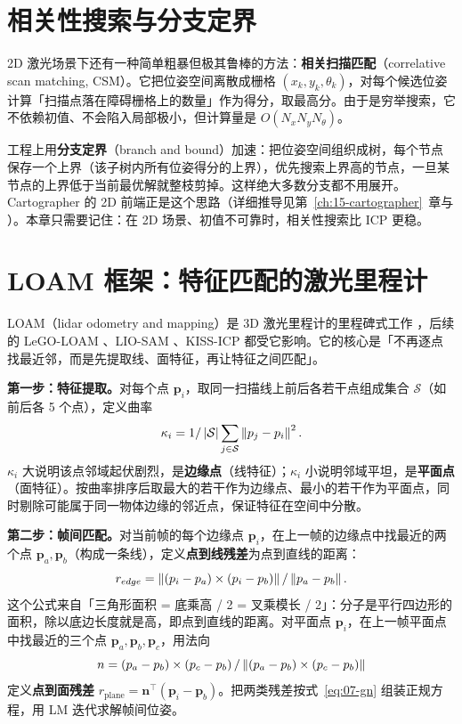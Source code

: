 \section{相关性搜索与分支定界}\label{sec:07-csm}

2D 激光场景下还有一种简单粗暴但极其鲁棒的方法：\textbf{相关扫描匹配}（correlative scan matching, CSM）。它把位姿空间离散成栅格 $(x_k,y_k,\theta_k)$，对每个候选位姿计算「扫描点落在障碍栅格上的数量」作为得分，取最高分。由于是穷举搜索，它不依赖初值、不会陷入局部极小，但计算量是 $O(N_xN_yN_\theta)$。

工程上用\textbf{分支定界}（branch and bound）加速：把位姿空间组织成树，每个节点保存一个上界（该子树内所有位姿得分的上界），优先搜索上界高的节点，一旦某节点的上界低于当前最优解就整枝剪掉。这样绝大多数分支都不用展开。Cartographer 的 2D 前端正是这个思路（详细推导见第~\ref{ch:15-cartographer}~章与 \cite{hess2016cartographer}）。本章只需要记住：在 2D 场景、初值不可靠时，相关性搜索比 ICP 更稳。

\section{LOAM 框架：特征匹配的激光里程计}\label{sec:07-loam}

LOAM（lidar odometry and mapping）是 3D 激光里程计的里程碑式工作 \cite{zhang2014loam}，后续的 LeGO-LOAM \cite{shan2018lego}、LIO-SAM \cite{shan2020liosam}、KISS-ICP \cite{vizzo2023kissicp} 都受它影响。它的核心是「不再逐点找最近邻，而是先提取线、面特征，再让特征之间匹配」。

\textbf{第一步：特征提取。}对每个点 $\bm{p}_i$，取同一扫描线上前后各若干点组成集合 $\mathcal{S}$（如前后各 5 个点），定义曲率
\begin{equation}
  \kappa_i = 1/\left\lvert \mathcal{S} \right\rvert\sum_{j\in\mathcal{S}}\left\lVert p_j-p_i \right\rVert^{2}.
  \label{eq:07-curvature}
\end{equation}
$\kappa_i$ 大说明该点邻域起伏剧烈，是\textbf{边缘点}（线特征）；$\kappa_i$ 小说明邻域平坦，是\textbf{平面点}（面特征）。按曲率排序后取最大的若干作为边缘点、最小的若干作为平面点，同时剔除可能属于同一物体边缘的邻近点，保证特征在空间中分散。

\textbf{第二步：帧间匹配。}对当前帧的每个边缘点 $\bm{p}_i$，在上一帧的边缘点中找最近的两个点 $\bm{p}_a,\bm{p}_b$（构成一条线），定义\textbf{点到线残差}为点到直线的距离：
\begin{equation}
  r_{edge} = \left\lVert \left(p_i-p_a\right)\times\left(p_i-p_b\right) \right\rVert/\left\lVert p_a-p_b \right\rVert.
\end{equation}
这个公式来自「三角形面积 = 底乘高 / 2 = 叉乘模长 / 2」：分子是平行四边形的面积，除以底边长度就是高，即点到直线的距离。对平面点 $\bm{p}_i$，在上一帧平面点中找最近的三个点 $\bm{p}_a,\bm{p}_b,\bm{p}_c$，用法向
\begin{equation}
  n = \left(p_a-p_b\right)\times\left(p_c-p_b\right)/\left\lVert \left(p_a-p_b\right)\times\left(p_c-p_b\right) \right\rVert
\end{equation}
定义\textbf{点到面残差} $r_{\text{plane}}=\bm{n}^{\top}(\bm{p}_i-\bm{p}_b)$。把两类残差按式~\eqref{eq:07-gn} 组装正规方程，用 LM 迭代求解帧间位姿。

